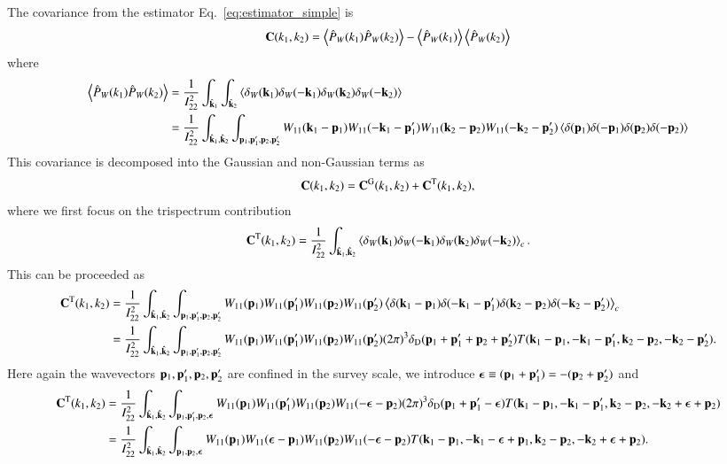 \documentclass[onecolumn,showpacs,amsmath,amssymb,prd,floatfix,preprintnumbers]{revtex4}
\newcommand{\bk}{{\bf k}}
\newcommand{\bp}{{\bf p}}
\def\avrg#1{\left\langle #1 \right\rangle}
\begin{document}
The covariance from the estimator Eq.~\ref{eq:estimator_simple} is 
\begin{align}
  {\bf C}(k_1,k_2) = \avrg{\hat{P}_W(k_1) \hat{P}_W(k_2)} - \avrg{\hat{P}_W(k_1)} \avrg{\hat{P}_W(k_2)}
\end{align}
where
\begin{align}
  \avrg{\hat{P}_W(k_1) \hat{P}_W(k_2)} &= \frac{1}{I_{22}^2} \int_{\hat{\bk}_1} \int_{\hat{\bk}_2} \avrg{\delta_W(\bk_1) \delta_W(-\bk_1) \delta_W(\bk_2) \delta_W(-\bk_2)} \nonumber \\
  &= \frac{1}{I_{22}^2} \int_{\hat{\bk}_1, \hat{\bk}_2} \int_{\bp_1,\bp'_1,\bp_2,\bp'_2} W_{11}(\bk_1-\bp_1) W_{11}(-\bk_1-\bp'_1) W_{11}(\bk_2-\bp_2) W_{11}(-\bk_2-\bp'_2) \avrg{\delta(\bp_1) \delta(-\bp_1) \delta(\bp_2) \delta(-\bp_2)}
\end{align}
This covariance is decomposed into the Gaussian and non-Gaussian terms as
\begin{align}
  {\bf C}(k_1,k_2) = {\bf C}^{\rm G}(k_1,k_2) + {\bf C}^{\rm T}(k_1,k_2),
\end{align}
where we first focus on the trispectrum contribution
\begin{align}
  {\bf C}^{\rm T}(k_1,k_2) = \frac{1}{I_{22}^2} \int_{\hat{\bk}_1, \hat{\bk}_2} \avrg{\delta_W(\bk_1) \delta_W(-\bk_1) \delta_W(\bk_2) \delta_W(-\bk_2)}_c.
\end{align}
This can be proceeded as
\begin{align}
  {\bf C}^{\rm T}(k_1,k_2) &= \frac{1}{I_{22}^2} \int_{\hat{\bk}_1, \hat{\bk}_2} \int_{\bp_1,\bp'_1,\bp_2,\bp'_2} W_{11}(\bp_1) W_{11}(\bp'_1) W_{11}(\bp_2) W_{11}(\bp'_2) \avrg{\delta(\bk_1-\bp_1) \delta(-\bk_1-\bp'_1) \delta(\bk_2-\bp_2) \delta(-\bk_2-\bp'_2)}_c \nonumber \\
  &= \frac{1}{I_{22}^2} \int_{\hat{\bk}_1, \hat{\bk}_2} \int_{\bp_1,\bp'_1,\bp_2,\bp'_2} W_{11}(\bp_1) W_{11}(\bp'_1) W_{11}(\bp_2) W_{11}(\bp'_2) 
  (2\pi)^3 \delta_{\rm D}(\bp_1+\bp'_1+\bp_2+\bp'_2) T(\bk_1-\bp_1, -\bk_1-\bp'_1, \bk_2-\bp_2, -\bk_2-\bp'_2). 
\end{align}
Here again the wavevectors $\bp_1,\bp'_1,\bp_2,\bp'_2$ are confined in the survey scale, we introduce ${\boldsymbol \epsilon} \equiv (\bp_1+\bp'_1) = - (\bp_2+\bp'_2)$ and 
\begin{align}
\label{eq:cov_nG_bc}
  {\bf C}^{\rm T}(k_1,k_2) &= \frac{1}{I_{22}^2} \int_{\hat{\bk}_1,\hat{\bk}_2} \int_{\bp_1,\bp'_1,\bp_2,{\boldsymbol \epsilon}} W_{11}(\bp_1) W_{11}(\bp'_1) W_{11}(\bp_2) W_{11}(-{\boldsymbol \epsilon}-\bp_2) 
  (2\pi)^3 \delta_{\rm D}(\bp_1+\bp'_1-{\boldsymbol \epsilon}) T(\bk_1-\bp_1, -\bk_1-\bp'_1, \bk_2-\bp_2, -\bk_2+{\boldsymbol \epsilon}+\bp_2) \nonumber \\
  &= \frac{1}{I_{22}^2} \int_{\hat{\bk}_1,\hat{\bk}_2} \int_{\bp_1,\bp_2,{\boldsymbol \epsilon}} W_{11}(\bp_1) W_{11}({\boldsymbol \epsilon}-\bp_1) W_{11}(\bp_2) W_{11}(-{\boldsymbol \epsilon}-\bp_2) T(\bk_1-\bp_1, -\bk_1-{\boldsymbol \epsilon}+\bp_1, \bk_2-\bp_2, -\bk_2+{\boldsymbol \epsilon}+\bp_2).
\end{align}
\end{document}

